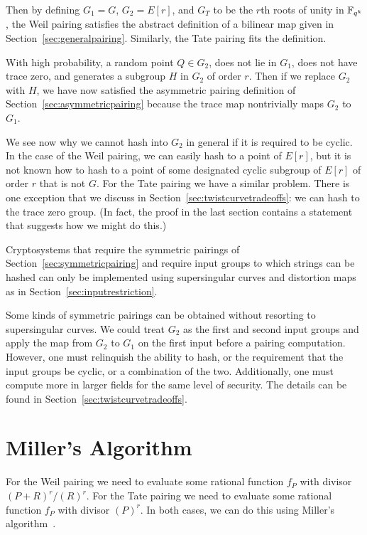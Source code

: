 Then by defining $G_1 = G$, $G_2 = E[r]$, and $G_T$ to be the $r$th roots
of unity in $\mathbb{F}_{q^k}$, the Weil pairing satisfies the abstract
definition of a bilinear map given in Section~\ref{sec:generalpairing}.
Similarly, the Tate pairing fits the definition.

With high probability, a random point $Q \in G_2$, does not
lie in $G_1$, does not have trace zero,
and generates a subgroup $H$ in $G_2$ of order $r$. Then
if we replace $G_2$ with $H$, we have now satisfied the asymmetric pairing
definition of Section~\ref{sec:asymmetricpairing} because the
trace map nontrivially maps $G_2$ to $G_1$.

We see now why we cannot hash into $G_2$ in general if it is required
to be cyclic.
In the case of the Weil pairing, we can easily hash to a point of $E[r]$,
but it is not known how to hash to a point of
some designated cyclic subgroup of $E[r]$ of order $r$ that is not $G$. 
For the Tate pairing we have a similar problem. There is one exception
that we discuss in Section~\ref{sec:twistcurvetradeoffs}: we can hash to the
trace zero group. (In fact, the proof in the last section contains a statement
that suggests how we might do this.)

Cryptosystems that require the
symmetric pairings of Section~\ref{sec:symmetricpairing}
and require input groups to which strings can be hashed can only be implemented
using supersingular curves and distortion maps as in
Section~\ref{sec:inputrestriction}.

Some kinds of symmetric pairings can be obtained without resorting to
supersingular curves. We could treat $G_2$ as the first and second input
groups and apply the map from $G_2$ to $G_1$ on the first
input before a pairing computation. However, one must relinquish the
ability to hash, or the requirement that the input groups be cyclic, or
a combination of the two. Additionally, one must compute more
in larger fields for the same level of security.
The details can be found in Section~\ref{sec:twistcurvetradeoffs}.

\section {Miller's Algorithm}

For the Weil pairing we need to evaluate some rational function
$f_P$ with divisor $(P+R)^r /(R)^r$.
For the Tate pairing we need to evaluate some rational function
$f_P$ with divisor $(P)^r$.
In both cases, we can do this using Miller's algorithm~\cite{miller,millerpub}.

